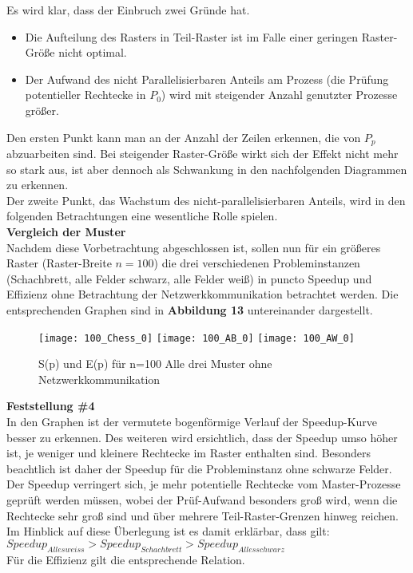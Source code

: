 \documentclass[
10pt, %
a4paper, %
oneside, %
headinclude,footinclude, %
BCOR5mm, %
]{scrartcl}
\begin{document}
Es wird klar, dass der Einbruch zwei Gründe hat.

\begin{itemize}[noitemsep] %
	\item Die Aufteilung des Rasters in Teil-Raster ist im Falle einer geringen Raster-Größe nicht optimal.
	\item Der Aufwand des nicht Parallelisierbaren Anteils am Prozess (die Prüfung potentieller Rechtecke in \(P_{0}\)) wird mit steigender Anzahl genutzter Prozesse größer.
\end{itemize}

Den ersten Punkt kann man an der Anzahl der Zeilen erkennen, die von \(P_{p}\) abzuarbeiten sind. Bei steigender Raster-Größe wirkt sich der Effekt nicht mehr so stark aus, ist aber dennoch als Schwankung in den nachfolgenden Diagrammen zu erkennen.\\
Der zweite Punkt, das Wachstum des nicht-parallelisierbaren Anteils, wird in den folgenden Betrachtungen eine wesentliche Rolle spielen. \\
 
\textbf{Vergleich der Muster}\\
Nachdem diese Vorbetrachtung abgeschlossen ist, sollen nun für ein größeres Raster (Raster-Breite \(n=100\)) die drei verschiedenen Probleminstanzen (Schachbrett, alle Felder schwarz, alle Felder weiß) in puncto Speedup und Effizienz ohne Betrachtung der Netzwerkkommunikation betrachtet werden.
Die entsprechenden Graphen sind in \textbf{Abbildung 13} untereinander dargestellt.\\

\begin{figure}[h]
	\centering 
	\texttt{[image: 100\_Chess\_0]} 
	\texttt{[image: 100\_AB\_0]} 
	\texttt{[image: 100\_AW\_0]} 
	\caption[S(p) und E(p) für n=100 Alle drei Muster ohne Netzwerkkomm.]{S(p) und E(p) für n=100 Alle drei Muster ohne Netzwerkkommunikation}
\end{figure}

\textbf{Feststellung \#4}\\
In den Graphen ist der vermutete bogenförmige Verlauf der Speedup-Kurve besser zu erkennen. Des weiteren wird ersichtlich, dass der Speedup umso höher ist, je weniger und kleinere Rechtecke im Raster enthalten sind. Besonders beachtlich ist daher der Speedup für die Probleminstanz ohne schwarze Felder.\\
Der Speedup verringert sich, je mehr potentielle Rechtecke vom Master-Prozesse geprüft werden müssen, wobei der Prüf-Aufwand besonders groß wird, wenn die Rechtecke sehr groß sind und über mehrere Teil-Raster-Grenzen hinweg reichen. \\
Im Hinblick auf diese Überlegung ist es damit erklärbar, dass gilt:\\
\(Speedup_{Alles weiss} > Speedup_{Schachbrett} > Speedup_{Alles schwarz} \)\\
Für die Effizienz gilt die entsprechende Relation.\\
\end{document}

